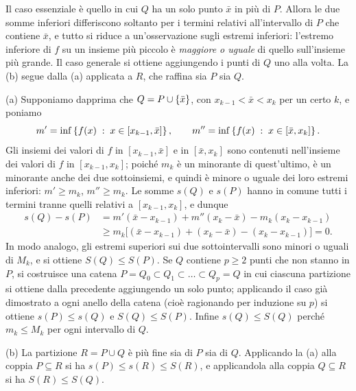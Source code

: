 \begin{schema}
\end{schema}

\begin{strategia}
Il caso essenziale è quello in cui $Q$ ha un solo punto $\bar x$ in più di $P$. Allora
le due somme inferiori differiscono soltanto per i termini relativi all'intervallo di
$P$ che contiene $\bar x$, e tutto si riduce a un'osservazione sugli estremi inferiori:
l'estremo inferiore di $f$ su un insieme più piccolo è \emph{maggiore o uguale} di quello
sull'insieme più grande. Il caso generale si ottiene aggiungendo i punti di $Q$ uno alla
volta. La (b) segue dalla (a) applicata a $R$, che raffina sia $P$ sia $Q$.
\end{strategia}

\begin{dimostrazione}
(a) Supponiamo dapprima che $Q=P\cup\left\{ \bar x \right\}$, con $x_{k-1}<\bar x<x_{k}$ per un certo
$k$, e poniamo
\[
  m'=\inf\left\{ f(x) \;:\; x\in[x_{k-1},\bar x] \right\}, \qquad
  m''=\inf\left\{ f(x) \;:\; x\in[\bar x,x_{k}] \right\} .
\]
Gli insiemi dei valori di $f$ in $[x_{k-1},\bar x]$ e in $[\bar x,x_{k}]$ sono contenuti
nell'insieme dei valori di $f$ in $[x_{k-1},x_{k}]$; poiché $m_{k}$ è un minorante di
quest'ultimo, è un minorante anche dei due sottoinsiemi, e quindi è minore o uguale dei
loro estremi inferiori: $m'\ge m_{k}$, $m''\ge m_{k}$. Le somme $s(Q)$ e $s(P)$ hanno in
comune tutti i termini tranne quelli relativi a $[x_{k-1},x_{k}]$, e dunque
\[
\begin{aligned}
  s(Q)-s(P)&=m'(\bar x-x_{k-1})+m''(x_{k}-\bar x)-m_{k}(x_{k}-x_{k-1})\\
  &\ge m_{k}\bigl[(\bar x-x_{k-1})+(x_{k}-\bar x)-(x_{k}-x_{k-1})\bigr]=0 .
\end{aligned}
\]
In modo analogo, gli estremi superiori sui due sottointervalli sono minori o uguali di
$M_{k}$, e si ottiene $S(Q)\le S(P)$. Se $Q$ contiene $p\ge2$ punti che non stanno in $P$,
si costruisce una catena $P=Q_{0}\subset Q_{1}\subset\dots\subset Q_{p}=Q$ in cui ciascuna
partizione si ottiene dalla precedente aggiungendo un solo punto; applicando il caso già
dimostrato a ogni anello della catena (cioè ragionando per induzione su $p$) si ottiene
$s(P)\le s(Q)$ e $S(Q)\le S(P)$. Infine $s(Q)\le S(Q)$ perché $m_{k}\le M_{k}$ per ogni
intervallo di $Q$.

(b) La partizione $R=P\cup Q$ è più fine sia di $P$ sia di $Q$. Applicando la (a) alla
coppia $P\subseteq R$ si ha $s(P)\le s(R)\le S(R)$, e applicandola alla coppia
$Q\subseteq R$ si ha $S(R)\le S(Q)$.
\end{dimostrazione}

